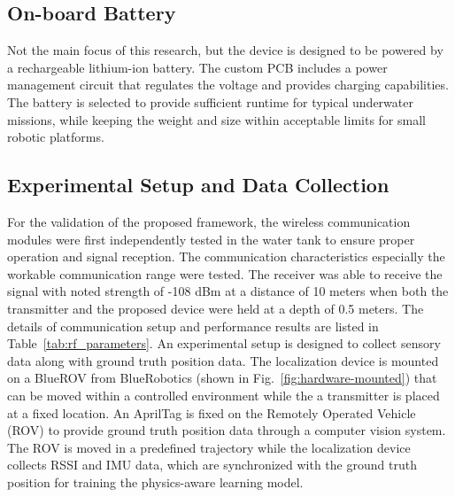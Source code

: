 \documentclass[subscriptcorrection,upint,varvw,barcolor=Goldenrod3,mathalfa=cal=euler,balance,hyphenate,pdf-a]{asmejour}
\begin{document}
\subsection{On-board Battery}
Not the main focus of this research, but the device is designed to be powered by a rechargeable lithium-ion battery. The custom PCB includes a power management circuit that regulates the voltage and provides charging capabilities. The battery is selected to provide sufficient runtime for typical underwater missions, while keeping the weight and size within acceptable limits for small robotic platforms.
\subsection{Experimental Setup and Data Collection}
For the validation of the proposed framework, the wireless communication modules were first independently tested in the water tank to ensure proper operation and signal reception. The communication characteristics especially the workable communication range were tested. The receiver was able to receive the signal with noted strength of -108 dBm at a distance of 10 meters when both the transmitter and the proposed device were held at a depth of 0.5 meters. The details of communication setup and performance results are listed in Table~\ref{tab:rf_parameters}. An experimental setup is designed to collect sensory data along with ground truth position data. The localization device is mounted on a BlueROV from BlueRobotics (shown in Fig.~\ref{fig:hardware-mounted}) that can be moved within a controlled environment while the a transmitter is placed at a fixed location. An AprilTag is fixed on the Remotely Operated Vehicle (ROV) to provide ground truth position data through a computer vision system. The ROV is moved in a predefined trajectory while the localization device collects RSSI and IMU data, which are synchronized with the ground truth position for training the physics-aware learning model.
\end{document}
